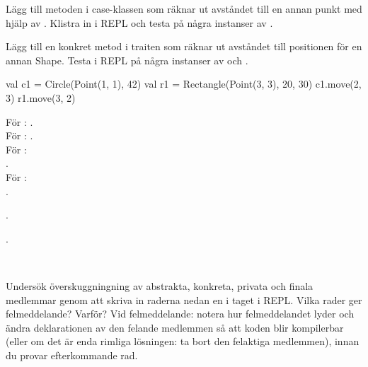 \Subtask Lägg till metoden  i case-klassen  som räknar ut avståndet till en annan punkt med hjälp av . Klistra in i REPL och testa på några instanser av .

\Subtask Lägg till en konkret metod  i traiten  som räknar ut avståndet till positionen för en annan Shape. Testa i REPL på några instanser av  och .

\SOLUTION


\TaskSolved \what


\SubtaskSolved
\begin{Code}
val c1 = Circle(Point(1, 1), 42)
val r1 = Rectangle(Point(3, 3), 20, 30)
c1.move(2, 3)
r1.move(3, 2)
\end{Code}

\SubtaskSolved  För : . \\
För : . \\
För :  \\
. \\
För :  \\
.

\SubtaskSolved  {}.

\SubtaskSolved  {}.


\QUESTEND







\QUESTBEGIN

\Task  \what~

\Subtask \label{subtask:overriderules} Undersök överskuggningning av abstrakta, konkreta, privata och finala medlemmar genom att skriva in raderna nedan en i taget i REPL. Vilka rader ger felmeddelande? Varför? Vid felmeddelande: notera hur felmeddelandet lyder och ändra deklarationen av den felande medlemmen så att koden blir kompilerbar (eller om det är enda rimliga lösningen: ta bort den felaktiga medlemmen), innan du provar efterkommande rad.

